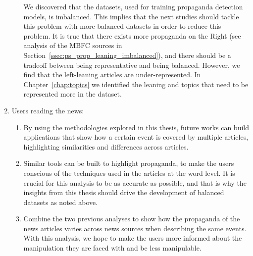 \begin{enumerate}
\begin{enumerate}
                    We discovered that the datasets, used for training propaganda detection models, is imbalanced. This implies that the next studies should tackle this problem with more balanced datasets in order to reduce this problem.
                    It is true that there exists more propaganda on the Right (see analysis of the MBFC sources in Section~\ref{ssec:ps_prop_leaning_imbalanced}), and there should be a tradeoff between being representative and being balanced. However, we find that the left-leaning articles are under-represented.
                    In Chapter~\ref{chap:topics} we identified the leaning and topics that need to be represented more in the dataset. %
          \end{enumerate}%
    \item Users reading the news:
          \begin{enumerate}
              \item By using the methodologies explored in this thesis, future works can build applications that show how a certain event is covered by multiple articles, highlighting similarities and differences across articles.%
              \item Similar tools can be built to highlight propaganda, to make the users conscious of the techniques used in the articles at the word level. It is crucial for this analysis to be as accurate as possible, and that is why the insights from this thesis should drive the development of balanced datasets as noted above.
              \item Combine the two previous analyses to show how the propaganda of the news articles varies across news sources when describing the same events. With this analysis, we hope to make the users more informed about the manipulation they are faced with and be less manipulable.
          \end{enumerate}
\end{enumerate}

